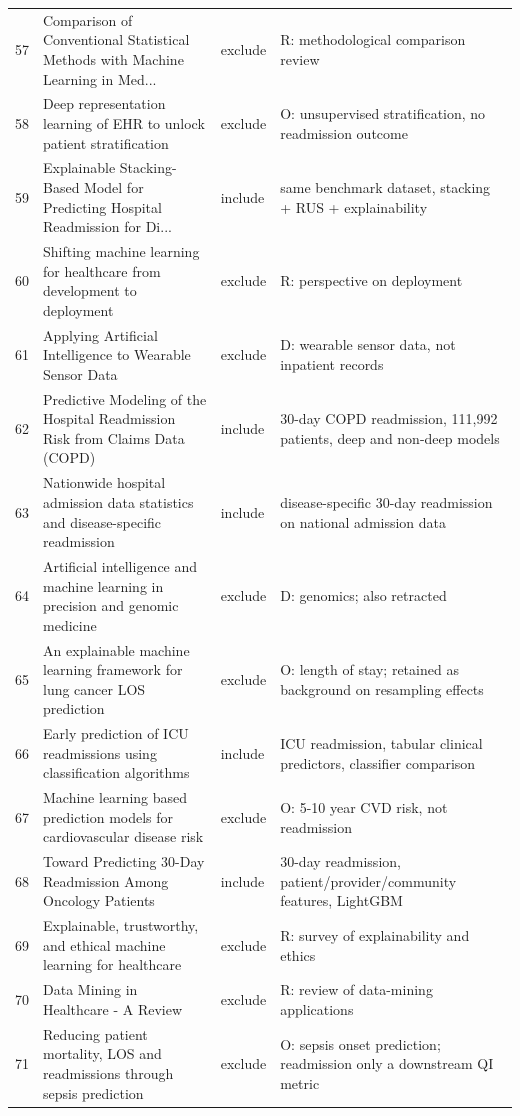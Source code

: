 \begin{longtable}{rp{4.9cm}p{1.35cm}p{4.6cm}}
57 & Comparison of Conventional Statistical Methods with Machine Learning in Med... & exclude & R: methodological comparison review \\
58 & Deep representation learning of EHR to unlock patient stratification & exclude & O: unsupervised stratification, no readmission outcome \\
59 & Explainable Stacking-Based Model for Predicting Hospital Readmission for Di... & include & same benchmark dataset, stacking + RUS + explainability \\
60 & Shifting machine learning for healthcare from development to deployment & exclude & R: perspective on deployment \\
61 & Applying Artificial Intelligence to Wearable Sensor Data & exclude & D: wearable sensor data, not inpatient records \\
62 & Predictive Modeling of the Hospital Readmission Risk from Claims Data (COPD) & include & 30-day COPD readmission, 111,992 patients, deep and non-deep models \\
63 & Nationwide hospital admission data statistics and disease-specific readmission & include & disease-specific 30-day readmission on national admission data \\
64 & Artificial intelligence and machine learning in precision and genomic medicine & exclude & D: genomics; also retracted \\
65 & An explainable machine learning framework for lung cancer LOS prediction & exclude & O: length of stay; retained as background on resampling effects \\
66 & Early prediction of ICU readmissions using classification algorithms & include & ICU readmission, tabular clinical predictors, classifier comparison \\
67 & Machine learning based prediction models for cardiovascular disease risk & exclude & O: 5-10 year CVD risk, not readmission \\
68 & Toward Predicting 30-Day Readmission Among Oncology Patients & include & 30-day readmission, patient/provider/community features, LightGBM \\
69 & Explainable, trustworthy, and ethical machine learning for healthcare & exclude & R: survey of explainability and ethics \\
70 & Data Mining in Healthcare - A Review & exclude & R: review of data-mining applications \\
71 & Reducing patient mortality, LOS and readmissions through sepsis prediction & exclude & O: sepsis onset prediction; readmission only a downstream QI metric \\

\end{longtable}
